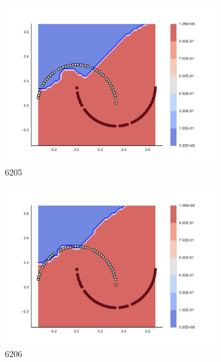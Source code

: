 \begin{figure}[h]
\begin{subfigure}[b]{0.09\textwidth}
    \includegraphics[clip, trim=2.35cm 1.75cm 4.5cm 0cm,width=\textwidth]{img/convergence/6205.pdf}
    \caption{6205}
    \label{fig:convergence_6205}
\end{subfigure}
%
\begin{subfigure}[b]{0.09\textwidth}
    \includegraphics[clip, trim=2.35cm 1.75cm 4.5cm 0cm,width=\textwidth]{img/convergence/6206.pdf}
    \caption{6206}
    \label{fig:convergence_6206}
\end{subfigure}
%
\begin{subfigure}[b]{0.09\textwidth}

\end{subfigure}
\end{figure}
